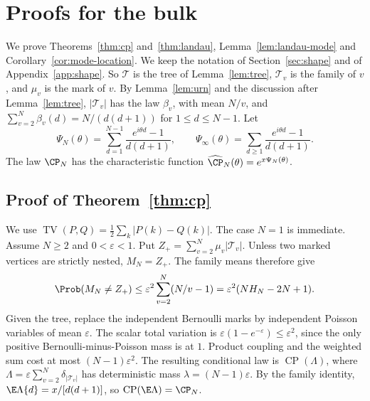 \section{Proofs for the bulk}\label{app:bulk}

We prove Theorems~\ref{thm:cp} and~\ref{thm:landau},
Lemma~\ref{lem:landau-mode} and Corollary~\ref{cor:mode-location}. We keep
the notation of Section~\ref{sec:shape} and of Appendix~\ref{app:shape}. So
$\mathcal T$ is the tree of Lemma~\ref{lem:tree}, $\mathcal T_v$ is the family
of $v$, and $\mu_v$ is the mark of $v$. By Lemma~\ref{lem:urn} and the
discussion after Lemma~\ref{lem:tree}, $\lvert\mathcal T_v\rvert$ has the law
$\beta_v$, with mean $N/v$, and $\sum_{v=2}^N\beta_v(d)=N/(d(d+1))$ for
$1\le d\le N-1$. Let
\[
 \Psi_N(\theta)=\sum_{d=1}^{N-1}\frac{e^{i\theta d}-1}{d(d+1)},\qquad
 \Psi_\infty(\theta)=\sum_{d\ge1}\frac{e^{i\theta d}-1}{d(d+1)} .
\]
The law $\CP_N$ has the characteristic function
$\widehat{\CP}_N(\theta)=e^{x\Psi_N(\theta)}$.

\subsection{Proof of Theorem~\ref{thm:cp}}\label{app:bulk-cp}

We use $\operatorname{TV}(P,Q)=\frac12\sum_k|P(k)-Q(k)|$.
The case $N=1$ is immediate. Assume $N\ge2$ and $0<\varepsilon<1$.
Put $Z_+=\sum_{v=2}^N\mu_v|\mathcal T_v|$. Unless two marked vertices
are strictly nested, $M_N=Z_+$. The family means therefore give
\[
 \Prob(M_N\ne Z_+)\le\varepsilon^2\sum_{v=2}^N(N/v-1)
 =\varepsilon^2(NH_N-2N+1).
\]
Given the tree, replace the independent Bernoulli marks by independent
Poisson variables of mean $\varepsilon$. The scalar total variation is
$\varepsilon(1-e^{-\varepsilon})\le\varepsilon^2$, since the only positive
Bernoulli-minus-Poisson mass is at $1$. Product coupling and the weighted
sum cost at most $(N-1)\varepsilon^2$. The resulting conditional law is
$\operatorname{CP}(\Lambda)$, where
$\Lambda=\varepsilon\sum_{v=2}^N\delta_{|\mathcal T_v|}$ has deterministic
mass $\lambda=(N-1)\varepsilon$. By the family identity,
$\E\Lambda\{d\}=x/[d(d+1)]$, so $\operatorname{CP}(\E\Lambda)=\CP_N$.

